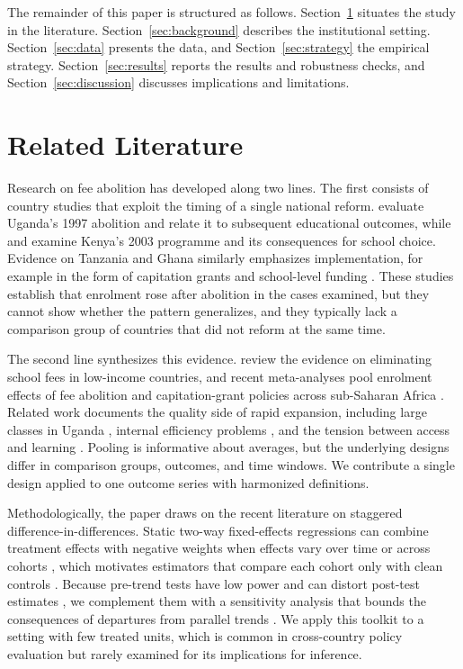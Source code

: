 \documentclass[12pt]{article}
\begin{document}
The remainder of this paper is structured as follows. Section~\ref{sec:lit} situates the study in the literature. Section~\ref{sec:background} describes the institutional setting. Section~\ref{sec:data} presents the data, and Section~\ref{sec:strategy} the empirical strategy. Section~\ref{sec:results} reports the results and robustness checks, and Section~\ref{sec:discussion} discusses implications and limitations.

\section{Related Literature}\label{sec:lit}

Research on fee abolition has developed along two lines. The first consists of country studies that exploit the timing of a single national reform. \citet{kan2020evaluating} evaluate Uganda's 1997 abolition and relate it to subsequent educational outcomes, while \citet{oketch2010free} and \citet{wallstrom2017is} examine Kenya's 2003 programme and its consequences for school choice. Evidence on Tanzania and Ghana similarly emphasizes implementation, for example in the form of capitation grants and school-level funding \citep{lindsjo2017everybody,pajibo2017influence}. These studies establish that enrolment rose after abolition in the cases examined, but they cannot show whether the pattern generalizes, and they typically lack a comparison group of countries that did not reform at the same time.

The second line synthesizes this evidence. \citet{morgan2014eliminating} review the evidence on eliminating school fees in low-income countries, and recent meta-analyses pool enrolment effects of fee abolition and capitation-grant policies across sub-Saharan Africa \citep{fermah2026school,fermah2026effect}. Related work documents the quality side of rapid expansion, including large classes in Uganda \citep{nakabugo2008universal}, internal efficiency problems \citep{nishimura2007internal}, and the tension between access and learning \citep{valente2015primary,nishimura2011the}. Pooling is informative about averages, but the underlying designs differ in comparison groups, outcomes, and time windows. We contribute a single design applied to one outcome series with harmonized definitions.

Methodologically, the paper draws on the recent literature on staggered difference-in-differences. Static two-way fixed-effects regressions can combine treatment effects with negative weights when effects vary over time or across cohorts \citep{goodmanbacon2021difference,dechaisemartin2020twoway}, which motivates estimators that compare each cohort only with clean controls \citep{callaway2021difference,sun2021estimating,borusyak2024revisiting}. Because pre-trend tests have low power and can distort post-test estimates \citep{roth2022pretest,roth2023trending}, we complement them with a sensitivity analysis that bounds the consequences of departures from parallel trends \citep{rambachan2023credible}. We apply this toolkit to a setting with few treated units, which is common in cross-country policy evaluation but rarely examined for its implications for inference.
\end{document}
